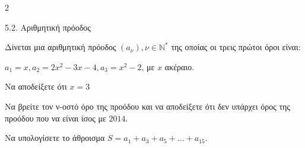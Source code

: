 \begin{ylh}{2}
    \item 5.2. Αριθμητική πρόοδος
\end{ylh}
Δίνεται μια αριθμητική πρόοδος $(a_\nu), \nu \in \mathbb{N}^*$ της οποίας οι τρεις πρώτοι όροι είναι:

$a_1 = x, a_2 = 2x^2 - 3x - 4, a_3 = x^2 - 2$, με $x$ ακέραιο.

\begin{alist}
\item Να αποδείξετε ότι $x = 3$
\item Να βρείτε τον ν-οστό όρο της προόδου και να αποδείξετε ότι δεν υπάρχει όρος της προόδου που να είναι ίσος με $2014$.
\item Να υπολογίσετε το άθροισμα $S = a_1 + a_3 + a_5 + \dots + a_{15}$.
\end{alist}

